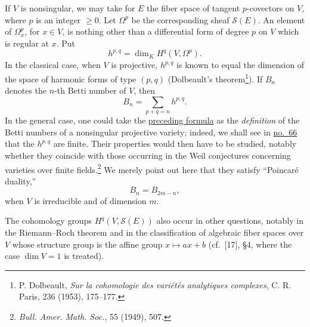 If $V$ is nonsingular, we may take for $E$ the fiber space of tangent $p$-covectors on $V$, where $p$ is an integer $\geq0$. Let $\Omega^p$ be the corresponding sheaf $\mathcal{S}(E)$. An element of $\Omega_x^p$, for $x\in V$, is nothing other than a differential form of degree $p$ on $V$ which is regular at $x$. Put
\label{fac:II:2:no:41:formula:h-p-q}
\[
h^{p,q}=\dim_K H^q(V,\Omega^p).
\]
In the classical case, when $V$ is projective, $h^{p,q}$ is known to equal the dimension of the space of harmonic forms of type $(p,q)$ (Dolbeault's theorem\footnote[3]{P. Dolbeault, \textit{Sur la cohomologie des variétés analytiques complexes}, C. R. Paris, 236 (1953), 175--177.}). If $B_n$ denotes the $n$-th Betti number of $V$, then
\label{fac:II:2:no:41:formula:Betti-sum}
\[
B_n=\sum_{p+q=n}h^{p,q}.
\]
In the general case, one could take the \hyperref[fac:II:2:no:41:formula:Betti-sum]{preceding formula} as the \textit{definition} of the Betti numbers of a nonsingular projective variety; indeed, we shall see in \hyperref[fac:III:3:no:66]{no.~66} that the $h^{p,q}$ are finite. Their properties would then have to be studied, notably whether they coincide with those occurring in the Weil conjectures concerning varieties over finite fields.\footnote[4]{\textit{Bull. Amer. Math. Soc.}, 55 (1949), 507.} We merely point out here that they satisfy ``Poincaré duality,''
\label{fac:II:2:no:41:formula:Poincare-duality}
\[
B_n=B_{2m-n},
\]
when $V$ is irreducible and of dimension $m$.

The cohomology groups $H^q(V,\mathcal{S}(E))$ also occur in other questions, notably in the Riemann--Roch theorem and in the classification of algebraic fiber spaces over $V$ whose structure group is the affine group $x\mapsto ax+b$ (cf.~[17], \S4, where the case $\dim V=1$ is treated).
